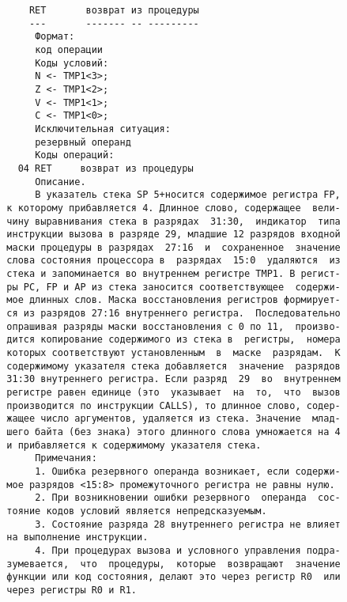 \begin{verbatim}
      RET       возврат из процедуры
      ---       ------- -- ---------
       Формат:
       код операции
       Коды условий:
       N <- TMP1<3>;
       Z <- TMP1<2>;
       V <- TMP1<1>;
       C <- TMP1<0>;
       Исключительная ситуация:
       резервный операнд
       Коды операций:
    04 RET     возврат из процедуры
       Описание.
       В указатель стека SP 5+носится содержимое регистра FP,
  к которому прибавляется 4. Длинное слово, содержащее  вели-
  чину выравнивания стека в разрядах  31:30,  индикатор  типа
  инструкции вызова в разряде 29, младшие 12 разрядов входной
  маски процедуры в разрядах  27:16  и  сохраненное  значение
  слова состояния процессора в  разрядах  15:0  удаляются  из
  стека и запоминается во внутреннем регистре TMP1. В регист-
  ры PC, FP и AP из стека заносится соответствующее  содержи-
  мое длинных слов. Маска восстановления регистров формирует-
  ся из разрядов 27:16 внутреннего регистра.  Последовательно
  опрашивая разряды маски восстановления с 0 по 11,  произво-
  дится копирование содержимого из стека в  регистры,  номера
  которых соответствуют установленным  в  маске  разрядам.  К
  содержимому указателя стека добавляется  значение  разрядов
  31:30 внутреннего регистра. Если разряд  29  во  внутреннем
  регистре равен единице (это  указывает  на  то,  что  вызов
  производится по инструкции CALLS), то длинное слово, содер-
  жащее число аргументов, удаляется из стека. Значение  млад-
  шего байта (без знака) этого длинного слова умножается на 4
  и прибавляется к содержимому указателя стека.
       Примечания:
       1. Ошибка резервного операнда возникает, если содержи-
  мое разрядов <15:8> промежуточного регистра не равны нулю.
       2. При возникновении ошибки резервного  операнда  сос-
  тояние кодов условий является непредсказуемым.
       3. Состояние разряда 28 внутреннего регистра не влияет
  на выполнение инструкции.
       4. При процедурах вызова и условного управления подра-
  зумевается,  что  процедуры,  которые  возвращают  значение
  функции или код состояния, делают это через регистр R0  или
  через регистры R0 и R1.

\end{verbatim}

